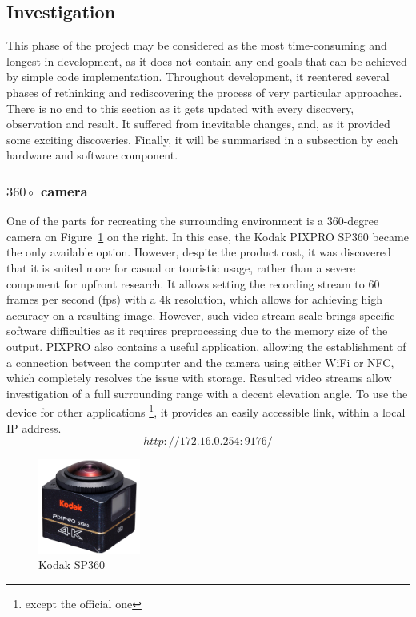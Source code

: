 \subsection{Investigation}
This phase of the project may be considered as the most time-consuming and longest in development, as it does not contain any end goals that can be achieved by simple code implementation.
Throughout development, it reentered several phases of rethinking and rediscovering the process of very particular approaches.\\
There is no end to this section as it gets updated with every discovery, observation and result.
It suffered from inevitable changes, and, as it provided some exciting discoveries.
Finally, it will be summarised in a subsection by each hardware and software component.
\subsubsection{$360\circ$ camera}
One of the parts for recreating the surrounding environment is a 360-degree camera on Figure~\ref{fig:camera} on the right. 
In this case, the Kodak PIXPRO SP360 became the only available option.
However, despite the product cost, it was discovered that it is suited more for casual or touristic usage, rather than a severe component for upfront research.
It allows setting the recording stream to 60 frames per second (fps) with a 4k resolution, which allows for achieving high accuracy on a resulting image.
However, such video stream scale brings specific software difficulties as it requires preprocessing due to the memory size of the output.
PIXPRO also contains a useful application, allowing the establishment of a connection between the computer and the camera using either WiFi or NFC, which completely resolves the issue with storage.
Resulted video streams allow investigation of a full surrounding range with a decent elevation angle.
To use the device for other applications \footnote{except the official one}, it provides an easily accessible link, within a local IP address.
\begin{equation*}
 http://172.16.0.254:9176/
\end{equation*}
\begin{figure}
    \centering
    \includegraphics[width=0.30\textwidth]{project/images/camera.png}
    \caption{Kodak SP360}
    \label{fig:camera}
\end{figure}
